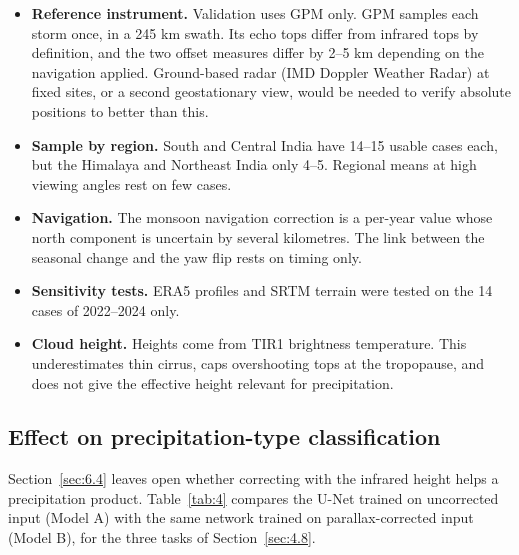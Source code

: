\begin{itemize}
\tightlist
\item
  \textbf{Reference instrument.} Validation uses GPM only. GPM samples each storm once, in a 245 km swath. Its echo tops differ from infrared tops by definition, and the two offset measures differ by 2--5 km depending on the navigation applied. Ground-based radar (IMD Doppler Weather Radar) at fixed sites, or a second geostationary view, would be needed to verify absolute positions to better than this.
\item
  \textbf{Sample by region.} South and Central India have 14--15 usable cases each, but the Himalaya and Northeast India only 4--5. Regional means at high viewing angles rest on few cases.
\item
  \textbf{Navigation.} The monsoon navigation correction is a per-year value whose north component is uncertain by several kilometres. The link between the seasonal change and the yaw flip rests on timing only.
\item
  \textbf{Sensitivity tests.} ERA5 profiles and SRTM terrain were tested on the 14 cases of 2022--2024 only.
\item
  \textbf{Cloud height.} Heights come from TIR1 brightness temperature. This underestimates thin cirrus, caps overshooting tops at the tropopause, and does not give the effective height relevant for precipitation.
\end{itemize}

\subsection{Effect on precipitation-type classification}\label{sec:6.8}

Section~\ref{sec:6.4} leaves open whether correcting with the infrared height helps a precipitation product. Table~\ref{tab:4} compares the U-Net trained on uncorrected input (Model A) with the same network trained on parallax-corrected input (Model B), for the three tasks of Section~\ref{sec:4.8}.

